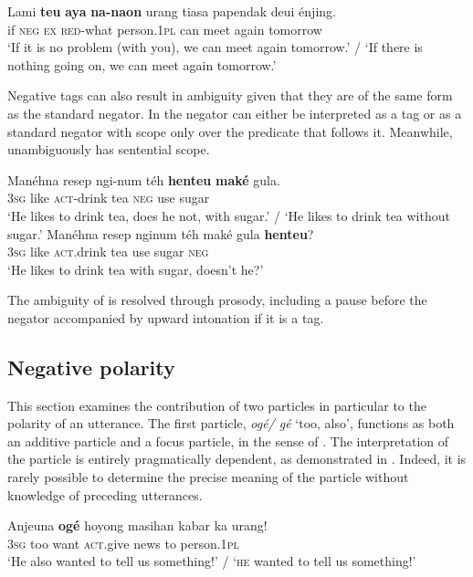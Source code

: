 \documentclass[output=paper]{langscibook}
\begin{document}
\ea\label{ex:sun:48} 
    \gll  Lami \textbf{teu} \textbf{aya} \textbf{na-naon} urang tiasa papendak deui énjing.\\ 
          if \textsc{neg} \textsc{ex} \textsc{red}{}-what person.1\textsc{pl} can meet again tomorrow\\
    \glt ‘If it is no problem (with you), we can meet again tomorrow.’ / ‘If there is nothing going on, we can meet again tomorrow.’
\z 

Negative tags can also result in ambiguity given that they are of the same form as the standard negator. In  the negator can either be interpreted as a tag or as a standard negator with scope only over the predicate that follows it. Meanwhile,  unambiguously has sentential scope. 

\ea\label{ex:sun:49}
    \ea\label{ex:sun:49a}
        \gll  Manéhna resep ngi-num téh \textbf{henteu} \textbf{maké} gula. \\ 
              3\textsc{sg} like \textsc{act}{}-drink tea \textsc{neg} use sugar\\
        \glt ‘He likes to drink tea, does he not, with sugar.’ / ‘He likes to drink tea without sugar.’
    \ex\label{ex:sun:49b}
        \gll  Manéhna resep nginum téh maké gula \textbf{henteu}?\\
              3\textsc{sg} like \textsc{act}.drink tea use sugar \textsc{neg}\\
        \glt ‘He likes to drink tea with sugar, doesn’t he?’
    \z
\z 

The ambiguity of  is resolved through prosody, including a pause before the negator accompanied by upward intonation if it is a tag.

\subsection{Negative polarity}\label{sec:sun:4.2}

This section examines the contribution of two particles in particular to the polarity of an utterance. The first particle, \textit{ogé/ gé} ‘too, also’, functions as both an additive particle and a focus particle, in the sense of \citet{König1991}. The interpretation of the particle is entirely pragmatically dependent, as demonstrated in . Indeed, it is rarely possible to determine the precise meaning of the particle without knowledge of preceding utterances. 

\ea\label{ex:sun:50} 
    \gll  Anjeuna \textbf{ogé} hoyong masihan kabar ka urang!\\ 
          3\textsc{sg} too want \textsc{act}.give news to person.1\textsc{pl}\\
    \glt ‘He also wanted to tell us something!’ / ‘\textsc{he} wanted to tell us something!’ \citep[184]{Butters2021}
\z 
\end{document}
